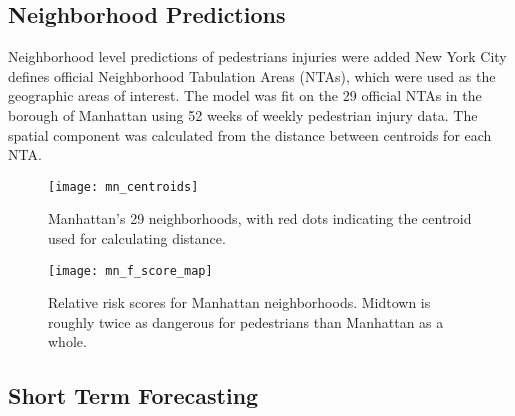 

 \subsection{Neighborhood Predictions}

 Neighborhood level predictions of pedestrians injuries were added
 New York City defines official Neighborhood Tabulation Areas (NTAs), which were used as the geographic areas of interest. The model was fit on the 29 official NTAs in the borough of Manhattan using 52 weeks of weekly pedestrian injury data. The spatial component was calculated from the distance between centroids for each NTA. \par

 \begin{figure}[h!]
   \caption{Manhattan's 29 neighborhoods, with red dots indicating the centroid used for calculating distance.}
   \texttt{[image: mn\_centroids]}
 \end{figure}

 \begin{figure}[h!]
   \caption{Relative risk scores for Manhattan neighborhoods. Midtown is roughly twice as dangerous for pedestrians than Manhattan as a whole.}
   \texttt{[image: mn\_f\_score\_map]}
 \end{figure}





\subsection{Short Term Forecasting}

